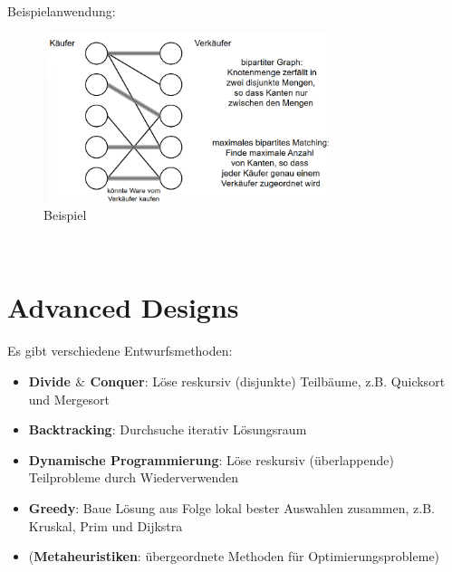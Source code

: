 \documentclass{article}
\begin{document}
                Beispielanwendung:
                \begin{figure}[ht]
                    \centering
                    \includegraphics[width=0.75\textwidth]{Bilder/MFMCTBsp.png}
                    \caption{Beispiel}
                    \label{fig:MFMCTBsp}
                \end{figure}\\


    \newpage
    \section{Advanced Designs}
        Es gibt verschiedene Entwurfsmethoden:
        \begin{itemize}
            \item \textbf{Divide $\&$ Conquer}: Löse reskursiv (disjunkte) Teilbäume, z.B. Quicksort und Mergesort
            \item \textbf{Backtracking}: Durchsuche iterativ Lösungsraum
            \item \textbf{Dynamische Programmierung}: Löse reskursiv (überlappende) Teilprobleme durch Wiederverwenden
            \item \textbf{Greedy}: Baue Lösung aus Folge lokal bester Auswahlen zusammen, z.B. Kruskal, Prim und Dijkstra
            \item (\textbf{Metaheuristiken}: übergeordnete Methoden für Optimierungsprobleme)
        \end{itemize}
\end{document}
